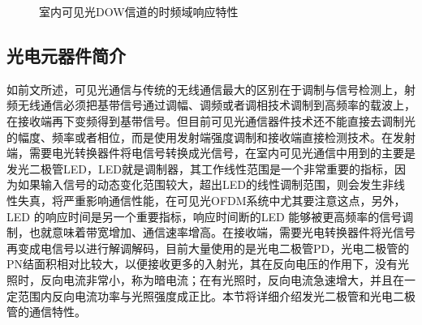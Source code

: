 \begin{figure}[htbp]
    \centering
    \caption{室内可见光DOW信道的时频域响应特性}
    \label{fig:DOWChannelResponse}
\end{figure}
\subsection{光电元器件简介}
如前文所述，可见光通信与传统的无线通信最大的区别在于调制与信号检测上，射频无线通信必须把基带信号通过调幅、调频或者调相技术调制到高频率的载波上，在接收端再下变频得到基带信号。但目前可见光通信器件技术还不能直接去调制光的幅度、频率或者相位，而是使用发射端强度调制和接收端直接检测技术。在发射端，需要电光转换器件将电信号转换成光信号，在室内可见光通信中用到的主要是发光二极管LED，LED就是调制器，其工作线性范围是一个非常重要的指标，因为如果输入信号的动态变化范围较大，超出LED的线性调制范围，则会发生非线性失真，将严重影响通信性能，在可见光OFDM系统中尤其要注意这点，另外，LED 的响应时间是另一个重要指标，响应时间断的LED 能够被更高频率的信号调制，也就意味着带宽增加、通信速率增高。在接收端，需要光电转换器件将光信号再变成电信号以进行解调解码，目前大量使用的是光电二极管PD，光电二极管的PN结面积相对比较大，以便接收更多的入射光，其在反向电压的作用下，没有光照时，反向电流非常小，称为暗电流；在有光照时，反向电流急速增大，并且在一定范围内反向电流功率与光照强度成正比。本节将详细介绍发光二极管和光电二极管的通信特性。
